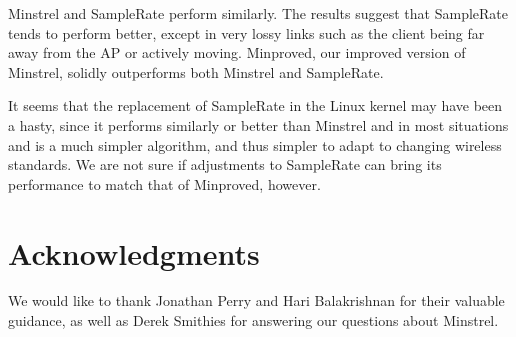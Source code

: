 \documentclass[twocolumn,10pt]{article}
\begin{document}
Minstrel and SampleRate perform similarly.  The results suggest that
SampleRate tends to perform better, except in very lossy
links such as the client being far away from the AP or actively
moving.  Minproved, our improved version of Minstrel, solidly
outperforms both Minstrel and SampleRate.

It seems that the replacement of SampleRate in the Linux kernel may
have been a hasty, since it performs similarly or better than Minstrel 
and in most situations and is a much simpler algorithm, and thus simpler
 to adapt to changing wireless standards.  We are not sure if 
adjustments to SampleRate can bring its performance to match that of 
Minproved, however.

\section*{Acknowledgments} \label{sec:acknowledgments}

We would like to thank Jonathan Perry and Hari Balakrishnan for their
valuable guidance, as well as Derek Smithies for answering our
questions about Minstrel.



\end{document}
